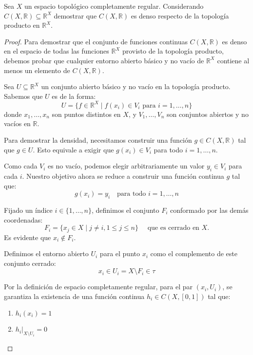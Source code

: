 \documentclass{article}
\theoremstyle{plain}
\theoremstyle{definition}
\newcommand{\R}{\mathbb{R}}
\newenvironment{ejercicio}[1]{\begin{trivlist}
\item[\hskip \labelsep {\bfseries Ejercicio}\hskip \labelsep {\bfseries #1.}]}{\end{trivlist}}
\begin{document}
\begin{ejercicio}{3}
    Sea \( X \) un espacio topológico completamente regular. Considerando \( C(X, \R) \subseteq \R^X \) demostrar que \( C(X, \R) \) es denso respecto de la topología producto en \( \R^X \).
\end{ejercicio}
\begin{proof}
    Para demostrar que el conjunto de funciones continuas \(C(X, \R)\)
    es denso en el espacio de todas las funciones \(\R^X\) provisto de la topología producto, debemos probar que cualquier entorno abierto básico y no vacío de \(\R^X\) contiene al menos un elemento de \(C(X, \R)\).

    Sea \(U \subseteq \R^X\) un conjunto abierto básico y no vacío en la topología producto. Sabemos que \( U \) es de la forma:
    \[
        U = \{f \in \R^X \mid f(x_i) \in V_i \text{ para } i = 1, \dots, n\}
    \]
    donde \( x_1, \dots, x_n \) son puntos distintos en \( X \), y \(V_1, \dots, V_n\) son conjuntos abiertos y no vacíos en \( \R \).

    Para demostrar la densidad, necesitamos construir una función \(g \in C(X, \R)\) tal que \(g \in U\). Esto equivale a exigir que \(g(x_i) \in V_i\) para todo \({i = 1, \dots, n}\).

    Como cada \(V_i\) es no vacío, podemos elegir arbitrariamente un valor \(y_i \in V_i\) para cada \(i\). Nuestro objetivo ahora se reduce a construir una función continua \(g\) tal que:
    \[
        g(x_i) = y_i \quad \text{para todo } i = 1, \dots, n
    \]

    Fijado un índice \( i \in \{1, \dots, n\} \), definimos el conjunto \(F_i\) conformado por las demás coordenadas:
    \[
        F_i = \{x_j \in X \mid j \neq i, 1 \leq j \leq n\} \quad \text{ que es cerrado en } X.
    \]
    Es evidente que \(x_i \notin F_i\).

    Definimos el entorno abierto \(U_i\) para el punto \(x_i\) como el complemento de este conjunto cerrado:
    \[
        x_i \in U_i = X \setminus F_i \in \tau
    \]

    Por la definición de espacio completamente regular, para el par \( (x_i, U_i) \), se garantiza la existencia de una función continua \(h_i \in C(X, [0, 1])\) tal que:
    \begin{enumerate}
        \item \(h_i(x_i) = 1\)
        \item \(h_i \big|_{X \setminus U_i} = 0\)
    \end{enumerate}


\end{proof}
\end{document}

